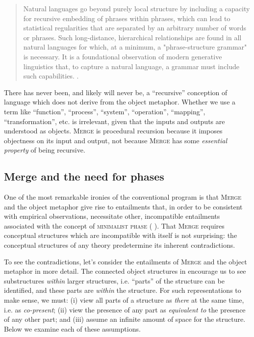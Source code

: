 \begin{quote}
Natural languages go beyond purely local structure by including a capacity for recursive embedding of phrases within phrases, which can lead to statistical regularities that are separated by an arbitrary number of words or phrases. Such long-distance, hierarchical relationships are found in all natural languages for which, at a minimum, a "phrase-structure grammar" is necessary. It is a foundational observation of modern generative linguistics that, to capture a natural language, a grammar must include such capabilities. \citep{HauserEtAl2002}. 
\end{quote}

  There has never been, and likely will never be, a “recursive” conception of language which does not derive from the object metaphor. Whether we use a term like “function”, “process”, “system”, “operation”, “mapping”, “transformation”, etc. is irrelevant, given that the inputs and outputs are understood as objects. \textsc{Merge} is procedural recursion because it imposes objectness on its input and output, not because \textsc{Merge} has some \textit{essential property} of being recursive.

\subsection{Merge and the need for phases}

One of the most remarkable ironies of the conventional program is that \textsc{Merge} and the object metaphor give rise to entailments that, in order to be consistent with empirical observations, necessitate other, incompatible entailments associated with the concept of \textsc{minimalist phase} (\textsc{\citeauthor{Chomsky2001b} \citeyear*{Chomsky2001b,Chomsky2008}}). That \textsc{Merge} requires conceptual structures which are incompatible with itself is not surprising: the conceptual structures of any theory predetermine its inherent contradictions.

  To see the contradictions, let's consider the entailments of \textsc{Merge} and the object metaphor in more detail. The connected object structures in {} encourage us to see substructures \textit{within} larger structures, i.e. “parts” of the structure can be identified, and these parts are \textit{within} the structure. For such representations to make sense, we must: (i) view all parts of a structure as \textit{there} at the same time, i.e. as \textit{co-present}; (ii) view the presence of any part as \textit{equivalent to} the presence of any other part; and (iii) assume an infinite amount of space for the structure. Below we examine each of these assumptions.
  
